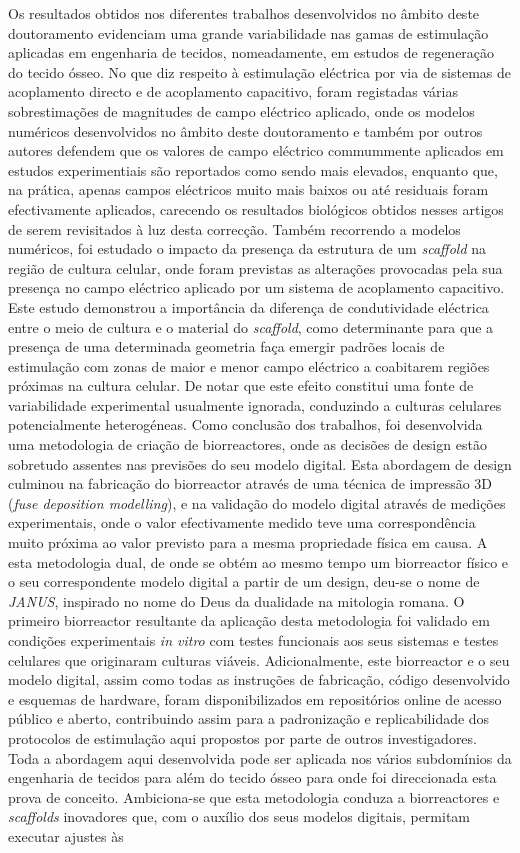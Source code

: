 \documentclass[12pt]{report}
\begin{document}
Os resultados obtidos nos diferentes trabalhos desenvolvidos no âmbito deste doutoramento evidenciam uma grande variabilidade nas gamas de estimulação aplicadas em engenharia de tecidos, nomeadamente, em estudos de regeneração do tecido ósseo. No que diz respeito à estimulação eléctrica por via de sistemas de acoplamento directo e de acoplamento capacitivo, foram registadas várias sobrestimações de magnitudes de campo eléctrico aplicado, onde os modelos numéricos desenvolvidos no âmbito deste doutoramento e também por outros autores defendem que os valores de campo eléctrico commummente aplicados em estudos experimentiais são reportados como sendo mais elevados, enquanto que, na prática, apenas campos eléctricos muito mais baixos ou até residuais foram efectivamente aplicados, carecendo os resultados biológicos obtidos nesses artigos de serem revisitados à luz desta correcção. Também recorrendo a modelos numéricos, foi estudado o impacto da presença da estrutura de um \textit{scaffold} na região de cultura celular, onde foram previstas as alterações provocadas pela sua presença no campo eléctrico aplicado por um sistema de acoplamento capacitivo. Este estudo demonstrou a importância da diferença de condutividade eléctrica entre o meio de cultura e o material do \textit{scaffold}, como determinante para que a presença de uma determinada geometria faça emergir padrões locais de estimulação com zonas de maior e menor campo eléctrico a coabitarem regiões próximas na cultura celular. De notar que este efeito constitui uma fonte de variabilidade experimental usualmente ignorada, conduzindo a culturas celulares potencialmente heterogéneas. Como conclusão dos trabalhos, foi desenvolvida uma metodologia de criação de biorreactores, onde as decisões de design estão sobretudo assentes nas previsões do seu modelo digital. Esta abordagem de design culminou na fabricação do biorreactor através de uma técnica de impressão 3D (\textit{fuse deposition modelling}), e na validação do modelo digital através de medições experimentais, onde o valor efectivamente medido teve uma correspondência muito próxima ao valor previsto para a mesma propriedade física em causa. A esta metodologia dual, de onde se obtém ao mesmo tempo um biorreactor físico e o seu correspondente modelo digital a partir de um design, deu-se o nome de \textit{JANUS}, inspirado no nome do Deus da dualidade na mitologia romana. O primeiro biorreactor resultante da aplicação desta metodologia foi validado em condições experimentais \textit{in vitro} com testes funcionais aos seus sistemas e testes celulares que originaram culturas viáveis. Adicionalmente, este biorreactor e o seu modelo digital, assim como todas as instruções de fabricação, código desenvolvido e esquemas de hardware, foram disponibilizados em repositórios online de acesso público e aberto, contribuindo assim para a padronização e replicabilidade dos protocolos de estimulação aqui propostos por parte de outros investigadores. Toda a abordagem aqui desenvolvida pode ser aplicada nos vários subdomínios da engenharia de tecidos para além do tecido ósseo para onde foi direccionada esta prova de conceito. Ambiciona-se que esta metodologia conduza a biorreactores e \textit{scaffolds} inovadores que, com o auxílio dos seus modelos digitais, permitam executar ajustes às 
\end{document}
